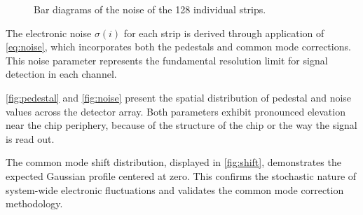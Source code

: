 \begin{figure}[H]
	\centering
	\caption{Bar diagrams of the noise of the 128 individual strips.}
	\label{fig:noise}
\end{figure}

The electronic noise $\sigma(i)$ for each strip is derived through application of \cref{eq:noise}, which incorporates both the pedestals and common mode corrections. This noise parameter represents the fundamental resolution limit for signal detection in each channel.

\autoref{fig:pedestal} and \autoref{fig:noise} present the spatial distribution of pedestal and noise values across the detector array. Both parameters exhibit pronounced elevation near the chip periphery, because of the structure of the chip or the way the signal is
read out. 

The common mode shift distribution, displayed in \autoref{fig:shift}, demonstrates the expected Gaussian profile centered at zero. This confirms the stochastic nature of system-wide electronic fluctuations and validates the common mode correction methodology.

